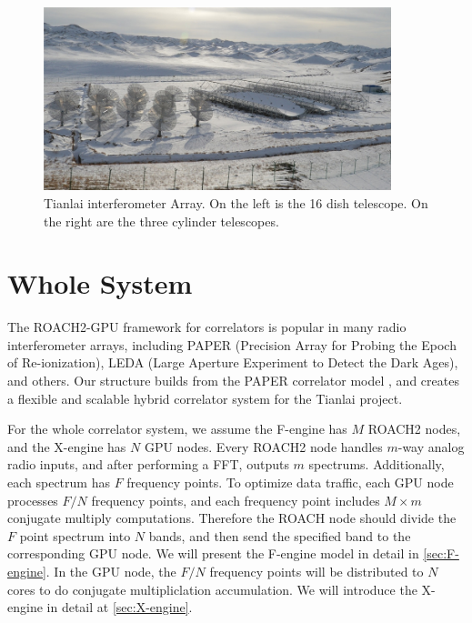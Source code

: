 \documentclass{ws-jai}
\begin{document}
\begin{figure}[t]
 \centering
\includegraphics[width=0.9\textwidth]{./picture/Tianlai.jpg}
\caption{Tianlai interferometer Array. On the left is the 16 dish telescope. On the right are the three cylinder telescopes.\label{fig:Tianlai}}
\end{figure}

\section{Whole System}\label{sec:1}
  

	The ROACH2-GPU framework for correlators is popular in many radio interferometer arrays, including PAPER (Precision Array for Probing the Epoch of Re-ionization)\cite{2010AJ....139.1468P}, LEDA (Large Aperture Experiment to Detect the Dark Ages), and others. Our structure builds from the PAPER correlator model \cite{2008PASP..120.1207P}, and creates a flexible and scalable hybrid correlator system for the Tianlai project.
	
	 For the whole correlator system, we assume the F-engine has $M$ ROACH2 nodes, and the X-engine has $N$ GPU nodes.  Every ROACH2 node handles $m$-way analog radio inputs, and after performing a FFT, outputs $m$ spectrums. Additionally, each spectrum has $F$ frequency points. To optimize data traffic, each GPU node processes ${F}/{N}$ frequency points, and each frequency point includes $M\times m$ conjugate multiply computations. Therefore the ROACH node should divide the $F$ point spectrum into $N$ bands, and then send the specified band to the corresponding GPU node. We will present the F-engine model in detail in \ref{sec:F-engine}. In the GPU node, the ${F}/{N}$ frequency points will be distributed to $N$ cores to do conjugate multipliclation accumulation. We will introduce the X-engine in detail at \ref{sec:X-engine}.            
	  
\end{document}
